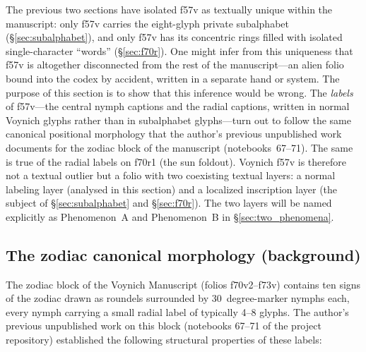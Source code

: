 The previous two sections have isolated f57v as textually unique within the
manuscript: only f57v carries the eight-glyph private subalphabet
(\S\ref{sec:subalphabet}), and only f57v has its concentric rings filled
with isolated single-character ``words'' (\S\ref{sec:f70r}). One might infer
from this uniqueness that f57v is altogether disconnected from the rest of
the manuscript---an alien folio bound into the codex by accident, written
in a separate hand or system. The purpose of this section is to show that
this inference would be wrong. The \emph{labels} of f57v---the central
nymph captions and the radial captions, written in normal Voynich glyphs
rather than in subalphabet glyphs---turn out to follow the same canonical
positional morphology that the author's previous unpublished work
documents for the zodiac block of the manuscript (notebooks~67--71). The
same is true of the radial labels on f70r1 (the sun foldout). Voynich f57v
is therefore not a textual outlier but a folio with two coexisting
textual layers: a normal labeling layer (analysed in this section) and a
localized inscription layer (the subject of \S\ref{sec:subalphabet} and
\S\ref{sec:f70r}). The two layers will be named explicitly as
Phenomenon~A and Phenomenon~B in \S\ref{sec:two_phenomena}.

\subsection{The zodiac canonical morphology (background)}
\label{sec:zodiac_canon}

The zodiac block of the Voynich Manuscript (folios f70v2--f73v) contains
ten signs of the zodiac drawn as roundels surrounded by 30~degree-marker
nymphs each, every nymph carrying a small radial label of typically 4--8
glyphs. The author's previous unpublished work on this block (notebooks
67--71 of the project repository) established the following structural
properties of these labels:

